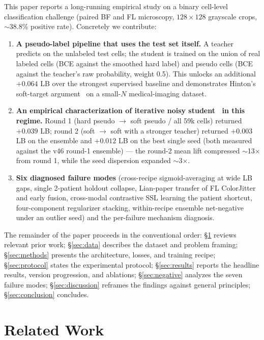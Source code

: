 \documentclass[conference]{IEEEtran}
\begin{document}
This paper reports a long-running empirical study on a binary cell-level classification challenge (paired BF and FL microscopy, $128 \times 128$ grayscale crops, $\sim$38.8\% positive rate). Concretely we contribute:

\begin{enumerate}
  \item \textbf{A pseudo-label pipeline that uses the test set itself.} A teacher predicts on the unlabeled test cells; the student is trained on the union of real labeled cells (BCE against the smoothed hard label) and pseudo cells (BCE against the teacher's raw probability, weight 0.5). This unlocks an additional $+0.064$ LB over the strongest supervised baseline and demonstrates Hinton's soft-target argument~\cite{hinton2015distilling} on a small-$N$ medical-imaging dataset.
  \item \textbf{An empirical characterization of iterative noisy student~\cite{xie2020noisystudent} in this regime.} Round 1 (hard pseudo $\rightarrow$ soft pseudo / all 59k cells) returned $+0.039$ LB; round 2 (soft $\rightarrow$ soft with a stronger teacher) returned $+0.003$ LB on the ensemble and $+0.012$ LB on the best single seed (both measured against the v46 round-1 ensemble) --- the round-2 mean lift compressed $\sim$13$\times$ from round 1, while the seed dispersion expanded $\sim$3$\times$.
  \item \textbf{Six diagnosed failure modes} (cross-recipe sigmoid-averaging at wide LB gaps, single 2-patient holdout collapse, Lian-paper transfer of FL ColorJitter and early fusion, cross-modal contrastive SSL learning the patient shortcut, four-component regularizer stacking, within-recipe ensemble net-negative under an outlier seed) and the per-failure mechanism diagnosis.
\end{enumerate}

The remainder of the paper proceeds in the conventional order: \S\ref{sec:related} reviews relevant prior work; \S\ref{sec:data} describes the dataset and problem framing; \S\ref{sec:methods} presents the architecture, losses, and training recipe; \S\ref{sec:protocol} states the experimental protocol; \S\ref{sec:results} reports the headline results, version progression, and ablations; \S\ref{sec:negative} analyzes the seven failure modes; \S\ref{sec:discussion} reframes the findings against general principles; \S\ref{sec:conclusion} concludes.

\section{Related Work}
\label{sec:related}
\end{document}
